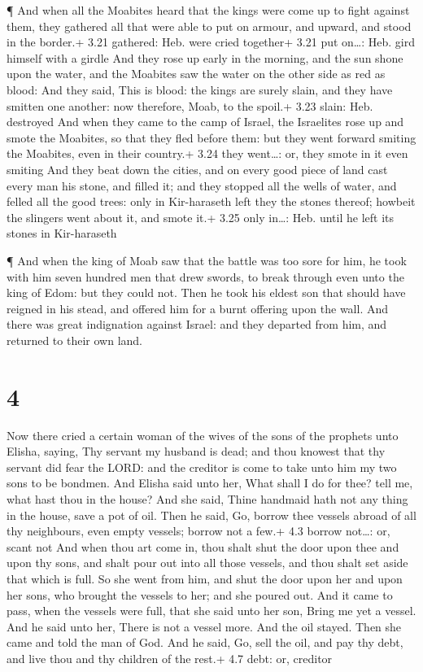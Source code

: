  ¶ And when all the Moabites heard that the kings were come
up to fight against them, they gathered all that were able to put on
armour, and upward, and stood in the border.+ 3.21 gathered: Heb. were
cried together+ 3.21 put on\ldots: Heb. gird himself with a girdle
 And they rose up early in the morning, and the sun shone
upon the water, and the Moabites saw the water on the other side as red
as blood:  And they said, This is blood: the kings are
surely slain, and they have smitten one another: now therefore, Moab, to
the spoil.+ 3.23 slain: Heb. destroyed  And when they came
to the camp of Israel, the Israelites rose up and smote the Moabites, so
that they fled before them: but they went forward smiting the Moabites,
even in their country.+ 3.24 they went\ldots: or, they smote in it even
smiting  And they beat down the cities, and on every good
piece of land cast every man his stone, and filled it; and they stopped
all the wells of water, and felled all the good trees: only in
Kir-haraseth left they the stones thereof; howbeit the slingers went
about it, and smote it.+ 3.25 only in\ldots: Heb. until he left its
stones in Kir-haraseth

 ¶ And when the king of Moab saw that the battle was too
sore for him, he took with him seven hundred men that drew swords, to
break through even unto the king of Edom: but they could not.
 Then he took his eldest son that should have reigned in
his stead, and offered him for a burnt offering upon the wall. And there
was great indignation against Israel: and they departed from him, and
returned to their own land.

\hypertarget{section-3}{%
\section{4}\label{section-3}}

 Now there cried a certain woman of the wives of the sons of
the prophets unto Elisha, saying, Thy servant my husband is dead; and
thou knowest that thy servant did fear the LORD: and the creditor is
come to take unto him my two sons to be bondmen.  And Elisha
said unto her, What shall I do for thee? tell me, what hast thou in the
house? And she said, Thine handmaid hath not any thing in the house,
save a pot of oil.  Then he said, Go, borrow thee vessels
abroad of all thy neighbours, even empty vessels; borrow not a few.+ 4.3
borrow not\ldots: or, scant not  And when thou art come in,
thou shalt shut the door upon thee and upon thy sons, and shalt pour out
into all those vessels, and thou shalt set aside that which is full.
 So she went from him, and shut the door upon her and upon
her sons, who brought the vessels to her; and she poured out.
 And it came to pass, when the vessels were full, that she
said unto her son, Bring me yet a vessel. And he said unto her, There is
not a vessel more. And the oil stayed.  Then she came and
told the man of God. And he said, Go, sell the oil, and pay thy debt,
and live thou and thy children of the rest.+ 4.7 debt: or, creditor

